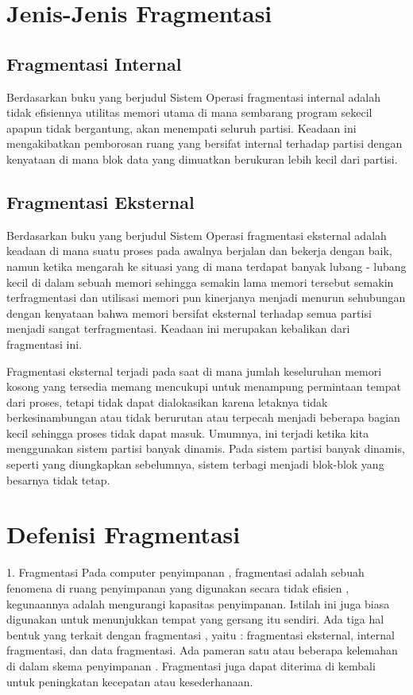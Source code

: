 
\section{Jenis-Jenis Fragmentasi}
\subsection{Fragmentasi Internal}
Berdasarkan buku yang berjudul Sistem Operasi \cite{pangera2005sistem} fragmentasi internal adalah tidak efisiennya utilitas memori utama di mana sembarang program sekecil apapun tidak bergantung, akan menempati seluruh partisi. Keadaan ini mengakibatkan pemborosan ruang yang bersifat internal terhadap partisi dengan kenyataan di mana blok data yang dimuatkan berukuran lebih kecil dari partisi.


\subsection{Fragmentasi Eksternal}
Berdasarkan buku yang berjudul Sistem Operasi \cite{pangera2005sistem} fragmentasi eksternal adalah keadaan di mana suatu proses pada awalnya berjalan dan bekerja dengan baik, namun ketika mengarah ke situasi yang di mana terdapat banyak lubang - lubang kecil di dalam sebuah memori sehingga semakin lama memori tersebut semakin terfragmentasi dan utilisasi memori pun kinerjanya menjadi menurun sehubungan dengan kenyataan bahwa memori bersifat eksternal terhadap semua partisi menjadi sangat terfragmentasi. Keadaan ini merupakan kebalikan dari fragmentasi ini.

Fragmentasi eksternal terjadi pada saat di mana jumlah keseluruhan memori kosong yang tersedia memang mencukupi untuk menampung permintaan tempat dari proses, tetapi tidak dapat dialokasikan karena letaknya tidak berkesinambungan atau tidak berurutan atau terpecah menjadi beberapa bagian kecil sehingga proses tidak dapat masuk. 
Umumnya, ini terjadi ketika kita menggunakan sistem partisi banyak dinamis. Pada sistem partisi banyak dinamis, seperti yang diungkapkan sebelumnya, sistem terbagi menjadi blok-blok yang besarnya tidak tetap.

\section{Defenisi Fragmentasi}
1. Fragmentasi
Pada computer penyimpanan  , fragmentasi adalah sebuah fenomena di ruang penyimpanan yang digunakan secara tidak efisien , kegunaannya adalah mengurangi kapasitas penyimpanan. Istilah ini juga biasa digunakan untuk menunjukkan tempat yang gersang itu sendiri.
Ada tiga hal bentuk yang terkait dengan fragmentasi , yaitu : fragmentasi eksternal, internal fragmentasi, dan data fragmentasi. Ada pameran satu atau beberapa kelemahan di dalam skema penyimpanan . Fragmentasi juga dapat diterima di kembali untuk peningkatan kecepatan atau kesederhanaan.

